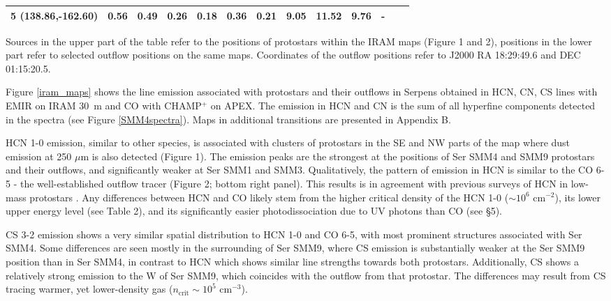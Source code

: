 \documentclass{aa}
\begin{document}
\begin{table*}
\begin{tabular}{l c c c c c c c c c c c c }
5 (138.86,-162.60) & 0.56 & 0.49 & 0.26 & 0.18 & 0.36 & 0.21 & 9.05 & 11.52 & 9.76 & - \\ 
\hline \end{tabular} 
\begin{flushleft} Sources in the upper part of the table refer to the positions of protostars
 within the IRAM maps (Figure 1 and 2), positions in the lower part refer to selected
outflow positions on the same maps. Coordinates of the outflow positions refer to J2000 RA 
18:29:49.6 and DEC 01:15:20.5. \\
\end{flushleft} 
\end{table*}
Figure \ref{iram_maps} shows the line emission associated with protostars and their outflows in 
Serpens obtained in HCN, CN, CS lines with EMIR on IRAM 30~m and CO with CHAMP$^+$ on APEX. 
The emission in HCN and CN is the sum of all hyperfine components detected in the spectra 
(see Figure \ref{SMM4spectra}). Maps in additional transitions are presented in Appendix B.

HCN 1-0 emission, similar to other species, is associated with clusters of protostars 
in the SE and NW parts of the map where dust emission at 250 $\mu$m is also detected (Figure 1). 
The emission peaks are the strongest at the positions of Ser SMM4 and SMM9 protostars and their outflows,
and significantly weaker at Ser SMM1 and SMM3. Qualitatively, the pattern of emission in
 HCN is similar to the CO 6-5 - the well-established outflow tracer (Figure 2; bottom right panel). 
 This results is in agreement with previous surveys of HCN in low-mass protostars \citep{Bac01,Wal14}.
 Any differences between HCN and CO likely stem from the higher critical density of the 
 HCN 1-0 ($\sim10^6$ cm$^{-2}$), its lower upper energy level (see Table 2), and its 
 significantly easier photodissociation due to UV photons than CO (see \S 5). 

CS 3-2 emission shows a very similar spatial distribution to HCN 1-0 and CO 6-5, with most 
prominent structures associated with Ser SMM4. Some differences are seen mostly in the 
surrounding of Ser SMM9, where CS emission is substantially weaker at the Ser SMM9 position 
than in Ser SMM4, in contrast to HCN which shows similar line strengths towards both protostars. 
Additionally, CS shows a relatively strong emission to the W of Ser SMM9, which coincides 
with the outflow from that protostar. The differences may result from CS tracing warmer, yet lower-density gas ($n_\mathrm{crit}\sim 10^5$ cm$^{-3}$).
\end{document}
